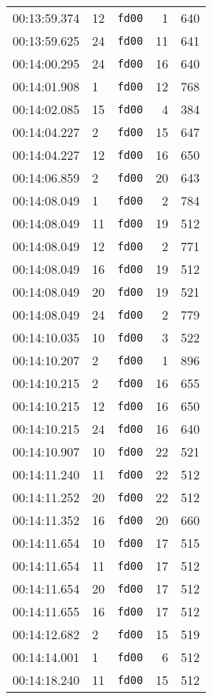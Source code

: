 \documentclass{article}
\begin{document}
\begin{longtable}{lllrr}
00:13:59.374 & 12 & \texttt{fd00} & 1 & 640 \\
00:13:59.625 & 24 & \texttt{fd00} & 11 & 641 \\
00:14:00.295 & 24 & \texttt{fd00} & 16 & 640 \\
00:14:01.908 & 1 & \texttt{fd00} & 12 & 768 \\
00:14:02.085 & 15 & \texttt{fd00} & 4 & 384 \\
00:14:04.227 & 2 & \texttt{fd00} & 15 & 647 \\
00:14:04.227 & 12 & \texttt{fd00} & 16 & 650 \\
00:14:06.859 & 2 & \texttt{fd00} & 20 & 643 \\
00:14:08.049 & 1 & \texttt{fd00} & 2 & 784 \\
00:14:08.049 & 11 & \texttt{fd00} & 19 & 512 \\
00:14:08.049 & 12 & \texttt{fd00} & 2 & 771 \\
00:14:08.049 & 16 & \texttt{fd00} & 19 & 512 \\
00:14:08.049 & 20 & \texttt{fd00} & 19 & 521 \\
00:14:08.049 & 24 & \texttt{fd00} & 2 & 779 \\
00:14:10.035 & 10 & \texttt{fd00} & 3 & 522 \\
00:14:10.207 & 2 & \texttt{fd00} & 1 & 896 \\
00:14:10.215 & 2 & \texttt{fd00} & 16 & 655 \\
00:14:10.215 & 12 & \texttt{fd00} & 16 & 650 \\
00:14:10.215 & 24 & \texttt{fd00} & 16 & 640 \\
00:14:10.907 & 10 & \texttt{fd00} & 22 & 521 \\
00:14:11.240 & 11 & \texttt{fd00} & 22 & 512 \\
00:14:11.252 & 20 & \texttt{fd00} & 22 & 512 \\
00:14:11.352 & 16 & \texttt{fd00} & 20 & 660 \\
00:14:11.654 & 10 & \texttt{fd00} & 17 & 515 \\
00:14:11.654 & 11 & \texttt{fd00} & 17 & 512 \\
00:14:11.654 & 20 & \texttt{fd00} & 17 & 512 \\
00:14:11.655 & 16 & \texttt{fd00} & 17 & 512 \\
00:14:12.682 & 2 & \texttt{fd00} & 15 & 519 \\
00:14:14.001 & 1 & \texttt{fd00} & 6 & 512 \\
00:14:18.240 & 11 & \texttt{fd00} & 15 & 512 \\

\end{longtable}
\end{document}
